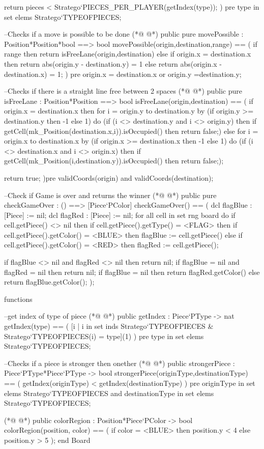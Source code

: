 \begin{vdmpp}[breaklines=true]
  return pieces < Stratego`PIECES_PER_PLAYER(getIndex(type));
 ) pre type in set elems Stratego`TYPEOFPIECES;
 
 --Checks if a move is possible to be done
(*@
\label{movePossible:162}
@*)
 public pure movePossible : Position*Position*bool ==> bool
 movePossible(origin,destination,range) == 
 (
  if range
   then return isFreeLane(origin,destination)
   else if origin.x = destination.x
    then return abs(origin.y - destination.y) = 1
    else return abs(origin.x - destination.x) = 1;
 ) 
 pre origin.x = destination.x or origin.y =destination.y;
 
 --Checks if there is a straight line free between 2 spaces
(*@
\label{isFreeLane:174}
@*)
 public pure isFreeLane : Position*Position ==> bool
 isFreeLane(origin,destination) == 
 (
  if origin.x = destination.x 
   then
    for i = origin.y to destination.y by (if origin.y >= destination.y then -1 else 1) do
     (if (i <> destination.y and i <> origin.y) then 
      if getCell(mk_Position(destination.x,i)).isOccupied() 
      then return false;)
   else 
    for i = origin.x to destination.x by (if origin.x >= destination.x then -1 else 1) do
     (if (i <> destination.x and i <> origin.x) then 
      if getCell(mk_Position(i,destination.y)).isOccupied() 
       then return false;);
     
   return true;
 )pre validCoords(origin) and validCoords(destination);
 
 --Check if Game is over and returns the winner
(*@
\label{checkGameOver:193}
@*)
 public pure checkGameOver : () ==> [Piece`PColor]
 checkGameOver() == 
 (
  dcl flagBlue : [Piece] := nil;
  dcl flagRed : [Piece] := nil;
  for all cell in set rng board do 
   if cell.getPiece() <> nil 
    then 
      if cell.getPiece().getType() = <FLAG> 
       then
        if cell.getPiece().getColor() = <BLUE>
         then flagBlue := cell.getPiece()
        else 
         if cell.getPiece().getColor() = <RED> 
          then flagRed := cell.getPiece();
          
  if flagBlue <> nil and flagRed <> nil then return nil;   
  if flagBlue = nil and flagRed = nil then return nil;     
  if flagBlue = nil then return flagRed.getColor() else return flagBlue.getColor();
 );
  
functions

 --get index of type of piece
(*@
\label{getIndex:217}
@*)
 public getIndex : Piece`PType -> nat
 getIndex(type) ==
 (
  [i | i in set inds Stratego`TYPEOFPIECES & Stratego`TYPEOFPIECES(i) = type](1)
 ) pre type in set elems Stratego`TYPEOFPIECES;
 
 --Checks if a piece is stronger then onether
(*@
\label{strongerPiece:224}
@*)
 public strongerPiece : Piece`PType*Piece`PType -> bool
 strongerPiece(originType,destinationType) == 
 (
   getIndex(originType) < getIndex(destinationType)
 ) pre originType in set elems Stratego`TYPEOFPIECES and destinationType in set elems Stratego`TYPEOFPIECES;
 
(*@
\label{colorRegion:230}
@*)
 public colorRegion : Position*Piece`PColor -> bool
 colorRegion(position, color) ==
  (
  if color = <BLUE> then position.y < 4 else position.y > 5
  );
end Board
\end{vdmpp}
